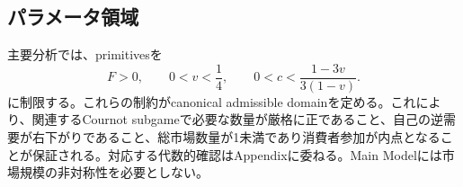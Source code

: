 \subsection{パラメータ領域}
\label{subsec:model-domain}

主要分析では、primitivesを
\begin{equation}
    F>0,
    \qquad
    0<v<\frac14,
    \qquad
    0<c<\frac{1-3v}{3(1-v)}.
    \label{eq:parameter-domain}
\end{equation}
に制限する。これらの制約がcanonical admissible domainを定める。これにより、関連するCournot subgameで必要な数量が厳格に正であること、自己の逆需要が右下がりであること、総市場数量が1未満であり消費者参加が内点となることが保証される。対応する代数的確認はAppendixに委ねる。Main Modelには市場規模の非対称性を必要としない。
